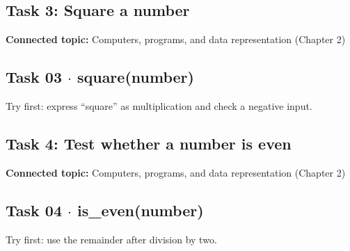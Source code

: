 \documentclass[11pt]{article}
\begin{document}
\begin{keepsection}
\section{Task 3: Square a number}

\textbf{Connected topic:} Computers, programs, and data representation (Chapter 2)

\begin{keepsection}
\subsection{Task 03 \ensuremath{\cdot} square(number)}

Try first: express “square” as multiplication and check a negative input.

\end{keepsection}
\end{keepsection}

\begin{keepsection}
\section{Task 4: Test whether a number is even}

\textbf{Connected topic:} Computers, programs, and data representation (Chapter 2)

\begin{keepsection}
\subsection{Task 04 \ensuremath{\cdot} is\_even(number)}

Try first: use the remainder after division by two.

\end{keepsection}
\end{keepsection}
\end{document}
